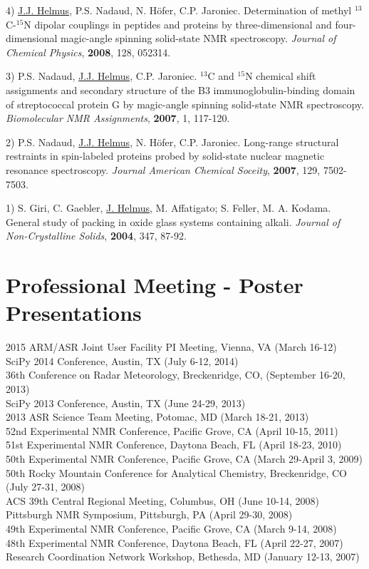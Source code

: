 \documentclass[margin,line]{res}
\begin{document}
\begin{resume}
4) \underline{J.J. Helmus}, P.S. Nadaud, N. H\"{o}fer, C.P. Jaroniec. 
Determination of methyl $^{13}$C-$^{15}$N dipolar couplings in peptides and proteins by 
three-dimensional and four-dimensional magic-angle spinning solid-state NMR spectroscopy.
{\em Journal of  Chemical Physics}, {\bf 2008}, 128, 052314.

3) P.S. Nadaud, \underline{J.J. Helmus}, C.P. Jaroniec. 
$^{13}$C and $^{15}$N chemical shift assignments and secondary structure of the 
B3 immunoglobulin-binding domain of streptococcal protein G by magic-angle spinning 
solid-state NMR spectroscopy.
{\em Biomolecular NMR Assignments}, {\bf 2007}, 1, 117-120. 

2) P.S. Nadaud, \underline{J.J. Helmus}, N. H\"{o}fer, C.P. Jaroniec. 
Long-range structural restraints in spin-labeled proteins probed by solid-state nuclear magnetic 
resonance spectroscopy.
{\em Journal American Chemical Soceity}, {\bf 2007}, 129, 7502-7503.

1) S. Giri, C. Gaebler, \underline{J. Helmus}, M. Affatigato; S. Feller, M. A. Kodama.
General study of packing in oxide glass systems containing alkali.
{\em Journal of Non-Crystalline Solids}, {\bf 2004}, 347, 87-92.

\section{\sc Professional Meeting - Poster Presentations}
2015 ARM/ASR Joint User Facility PI Meeting, Vienna, VA (March 16-12)\\
SciPy 2014 Conference, Austin, TX (July 6-12, 2014)\\
36th Conference on Radar Meteorology, Breckenridge, CO, (September 16-20, 2013)\\
SciPy 2013 Conference, Austin, TX (June 24-29, 2013)\\
2013 ASR Science Team Meeting, Potomac, MD (March 18-21, 2013)\\
52nd Experimental NMR Conference, Pacific Grove, CA (April 10-15, 2011) \\
51st Experimental NMR Conference, Daytona Beach, FL (April 18-23, 2010)\\ 
50th Experimental NMR Conference, Pacific Grove, CA (March 29-April 3, 2009)\\
50th Rocky Mountain Conference for Analytical Chemistry, Breckenridge, CO (July 27-31, 2008)\\ 
ACS 39th Central Regional Meeting, Columbus, OH (June 10-14, 2008)\\
Pittsburgh NMR Symposium, Pittsburgh, PA (April 29-30, 2008)\\
49th Experimental NMR Conference, Pacific Grove, CA (March 9-14, 2008)\\
48th Experimental NMR Conference, Daytona Beach, FL (April 22-27, 2007)\\
Research Coordination Network Workshop, Bethesda, MD (January 12-13, 2007)\\


\end{resume}
\end{document}
